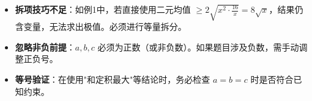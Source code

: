 \begin{trapbox}
\begin{itemize}
    \item \textbf{拆项技巧不足}：如例1中，若直接使用二元均值 $\geqslant 2\sqrt{x^2 \cdot \frac{16}{x}} = 8\sqrt{x}$，结果仍含变量，无法求出极值。必须进行等量拆分。
    \item \textbf{忽略非负前提}：$a, b, c$ 必须为正数（或非负数）。如果题目涉及负数，需手动调整正负号。
    \item \textbf{等号验证}：在使用"和定积最大"等结论时，务必检查 $a=b=c$ 时是否符合已知约束。
\end{itemize}
\end{trapbox}